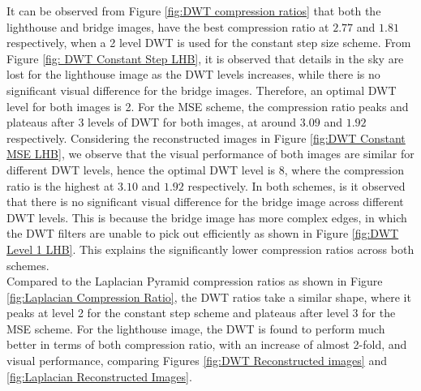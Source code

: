 It can be observed from Figure \ref{fig:DWT compression ratios} that both the lighthouse and bridge images, have the best compression ratio at $2.77$ and $1.81$ respectively, when a 2 level DWT is used for the constant step size scheme. From Figure \ref{fig: DWT Constant Step LHB}, it is observed that details in the sky are lost for the lighthouse image as the DWT levels increases, while there is no significant visual difference for the bridge images. Therefore, an optimal DWT level for both images is 2. For the MSE scheme, the compression ratio peaks and plateaus after 3 levels of DWT for both images, at around $3.09$ and $1.92$ respectively. Considering the reconstructed images in Figure \ref{fig:DWT Constant MSE LHB}, we observe that the visual performance of both images are similar for different DWT levels, hence the optimal DWT level is 8, where the compression ratio is the highest at $3.10$ and $1.92$ respectively. In both schemes, is it observed that there is no significant visual difference for the bridge image across different DWT levels. This is because the bridge image has more complex edges, in which the DWT filters are unable to pick out efficiently as shown in Figure \ref{fig:DWT Level 1 LHB}. This explains the significantly lower compression ratios across both schemes.\\

Compared to the Laplacian Pyramid compression ratios as shown in Figure \ref{fig:Laplacian Compression Ratio}, the DWT ratios take a similar shape, where it peaks at level 2 for the constant step scheme and plateaus after level 3 for the MSE scheme. For the lighthouse image, the DWT is found to perform much better in terms of both compression ratio, with an increase of almost 2-fold, and visual performance, comparing Figures \ref{fig:DWT Reconstructed images} and \ref{fig:Laplacian Reconstructed Images}.
